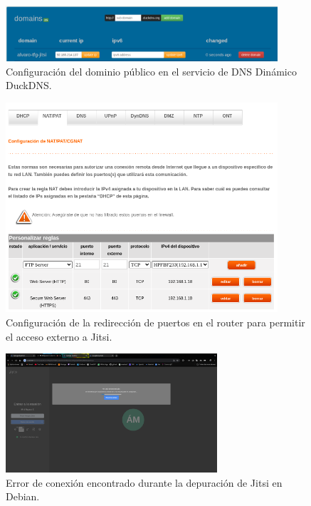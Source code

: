 \begin{figure}[H]
    \centering
    \includegraphics[width=0.9\textwidth]{img/duckdns.png}
    \caption{Configuración del dominio público en el servicio de DNS Dinámico DuckDNS.}
    \label{fig:apendice_d_duckdns}
\end{figure}

\begin{figure}[H]
    \centering
    \includegraphics[width=0.9\textwidth]{img/routerconfig.png}
    \caption{Configuración de la redirección de puertos en el router para permitir el acceso externo a Jitsi.}
    \label{fig:apendice_d_router}
\end{figure}

\begin{figure}[H]
    \centering
    \includegraphics[width=0.7\textwidth]{img/errorconexion.png}
    \caption{Error de conexión encontrado durante la depuración de Jitsi en Debian.}
    \label{fig:apendice_d_error_conexion}
\end{figure}

